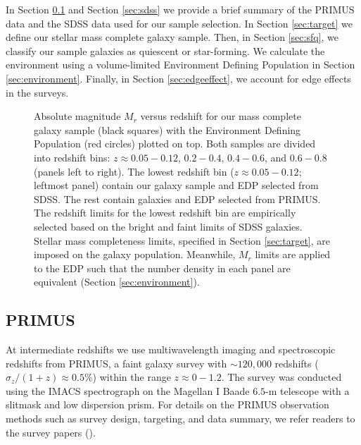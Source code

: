 \documentclass{emulateapj}
\begin{document}
In Section \ref{sec:primus} and Section \ref{sec:sdss} we provide a
brief summary of the PRIMUS data and the SDSS data used for our sample
selection. In Section \ref{sec:target} we define our stellar mass complete galaxy sample.  
Then, in Section \ref{sec:sfq}, we classify our sample galaxies as quiescent or star-forming. 
We calculate the environment
using a volume-limited Environment Defining Population in Section
\ref{sec:environment}.  Finally, in Section \ref{sec:edgeeffect}, we
account for edge effects in the surveys.

\begin{figure*}
    \begin{center}
        \leavevmode
        \caption{Absolute magnitude $M_{r}$ versus redshift for our mass complete galaxy sample (black squares) with the Environment Defining Population (red circles) plotted on top. Both samples are divided into redshift bins: $z \approx 0.05-0.12$, $0.2-0.4$, $0.4-0.6$, and $0.6-0.8$ (panels left to right). The lowest redshift bin ($z \approx 0.05-0.12$; leftmost panel) contain our galaxy sample and EDP selected from SDSS. The rest contain galaxies and EDP selected from PRIMUS. The redshift limits for the lowest redshift bin are empirically selected based on the bright and faint limits of SDSS galaxies. Stellar mass completeness limits, specified in Section \ref{sec:target}, are imposed on the galaxy population. Meanwhile, $M_{r}$ limits are applied to the EDP such that the number density in each panel are equivalent (Section \ref{sec:environment}).} \label{fig:targetEDP}
    \end{center}
\end{figure*}
\subsection{PRIMUS} \label{sec:primus}
At intermediate redshifts we use multiwavelength imaging and
spectroscopic redshifts from PRIMUS, a faint galaxy survey with $\sim
120,000$ redshifts ($\sigma_z/(1+z) \approx 0.5 \%$) within the range
$z \approx 0-1.2$. The survey was conducted using the IMACS
spectrograph on the Magellan I Baade $6.5$-m telescope with a slitmask and low dispersion prism. For details on the PRIMUS observation methods such as survey design, targeting, and data summary, we refer readers to the survey papers (\citealt{Coil:2011aa, Cool:2013aa}). 
\end{document}
